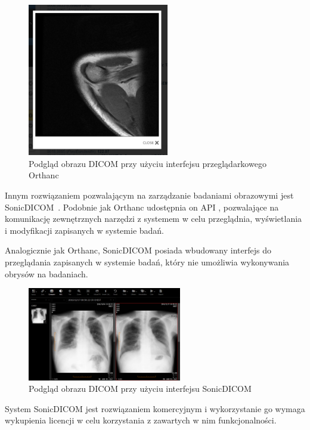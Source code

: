 \documentclass[a4paper,11pt,twoside,openright]{report}
\theoremstyle{definition}
\begin{document}
\begin{figure}[tbh!]
	\center
	\includegraphics[width=0.55\textwidth]{Orthanc-preview}
	\caption{Podgląd obrazu DICOM przy użyciu interfejsu przeglądarkowego Orthanc}
    	\label{fig:Orthanc-preview}
\end{figure}

Innym rozwiązaniem pozwalającym na zarządzanie badaniami obrazowymi jest SonicDICOM~\cite{SonicDICOM}.
Podobnie jak Orthanc udostępnia on API \cite{SonicDICOM API}, pozwalające na komunikację zewnętrznych narzędzi
z systemem w celu przeglądnia, wyświetlania i modyfikacji zapisanych w systemie badań.

Analogicznie jak Orthanc, SonicDICOM posiada wbudowany interfejs do przeglądania
zapisanych w systemie badań, który nie umożliwia wykonywania obrysów na badaniach.

\begin{figure}[tb!]
	\center
	\includegraphics[width=0.6\textwidth]{SoniCDICOMViewer}
	\caption{Podgląd obrazu DICOM przy użyciu interfejsu SonicDICOM \cite{SonicDICOM API}}
    	\label{fig:SonicDICOM}
\end{figure}

System SonicDICOM jest rozwiązaniem komercyjnym i wykorzystanie go wymaga wykupienia
licencji w celu korzystania z zawartych w nim funkcjonalności.
\end{document}
